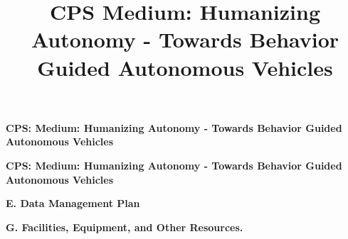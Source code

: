 \documentclass{article}
\title{CPS Medium: Humanizing Autonomy - Towards Behavior Guided Autonomous Vehicles}
\begin{document}
\maketitle

\thispagestyle{empty}

\newpage

\renewcommand{\thepage}{A-\arabic{page}}
\setcounter{page}{1}
\centerline{\Large\bf CPS: Medium: Humanizing Autonomy - Towards Behavior Guided Autonomous Vehicles}


\newpage
\renewcommand{\thepage}{B-\arabic{page}}
\setcounter{page}{1}
\tableofcontents
{} 

\newpage

\renewcommand{\thepage}{C-\arabic{page}}
\setcounter{page}{1}
\centerline{\Large\bf CPS: Medium: Humanizing Autonomy - Towards Behavior Guided Autonomous Vehicles}





%

\newpage
\renewcommand{\thepage}{D-\arabic{page}}
\setcounter{page}{1}



\newpage
\renewcommand{\thepage}{E-\arabic{page}}
\setcounter{page}{1}
\centerline{\Large\bf E. Data Management Plan}



\newpage
\renewcommand{\thepage}{G-\arabic{page}}
\setcounter{page}{1}
\centerline{\Large\bf G. Facilities, Equipment, and Other Resources.}
\vspace{0.3in}


% 
\end{document}
